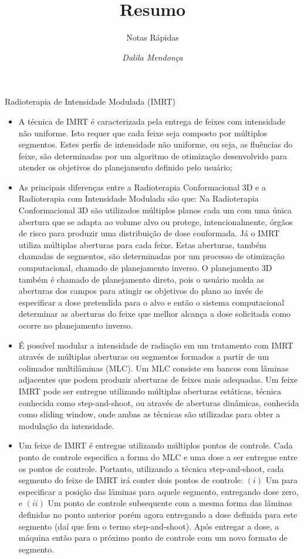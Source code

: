 \documentclass[11pt,a4paper]{article}
\title{Resumo}
\author{Notas Rápidas \nocite{*}}
\date{\textit{Dalila Mendonça}}
\newcounter{exemplo}
\begin{document}
	\maketitle


\begin{exemplo}
    \textcolor{CarnationPink}{Radioterapia de Intensidade Modulada (IMRT)}
    \begin{itemize}
        \item A técnica de IMRT é caracterizada pela entrega de feixes com intensidade não uniforme. Isto requer que cada feixe seja composto por múltiplos segmentos. Estes perfis de intensidade não uniforme, ou seja, as fluências do feixe,  são determinadas por um algoritmo de otimização desenvolvido para atender os objetivos do planejamento definido pelo usuário;
        
        \item As principais diferenças entre a Radioterapia Conformacional 3D e a Radioterapia com Intensidade Modulada são que: Na Radioterapia Conformacional 3D são utilizados múltiplos planos cada um com uma única abertura que se adapta ao volume alvo ou protege, intencionalmente, órgãos de risco para produzir uma distribuição de dose conformada. Já o IMRT utiliza múltiplas aberturas para cada feixe. Estas aberturas, também chamadas de segmentos, são determinadas por um processo de otimização computacional, chamado de \textcolor{CarnationPink}{planejamento inverso}. O planejamento 3D também é chamado de \textcolor{CarnationPink}{planejamento direto}, pois o usuário molda as aberturas dos campos para atingir os objetivos do plano ao invés de especificar a dose pretendida para o alvo e então o sistema computacional determinar as aberturas do feixe que melhor alcança a dose solicitada como ocorre no planejamento inverso.
        
        \item É possível modular a intensidade de radiação em um tratamento com IMRT através de múltiplas aberturas ou segmentos formados a partir de um colimador multilâminas (MLC). Um MLC consiste em bancos com lâminas adjacentes que podem produzir aberturas de feixes mais adequadas. Um feixe IMRT pode ser entregue utilizando múltiplas aberturas estáticas, técnica conhecida como step-and-shoot, ou através de aberturas dinâmicas, conhecida como sliding window, onde ambas as técnicas são utilizadas para obter a modulação da intensidade. 
        
        \item Um feixe de IMRT é entregue utilizando múltiplos pontos de controle. Cada ponto de controle especifica a forma do MLC e uma dose a ser entregue entre os pontos de controle. Portanto, utilizando a técnica \textcolor{CarnationPink}{step-and-shoot}, cada segmento do feixe de IMRT irá conter dois pontos de controle: $(i)$ Um para especificar a posição das lâminas para aquele segmento, entregando dose zero, e $(ii)$ Um ponto de controle subsequente com a mesma forma das lâminas definidas no ponto anterior  porém agora entregando a dose definida para este segmento (daí que fem o termo step-and-shoot). Após entregar a dose, a máquina então para o próximo ponto de controle com um novo formato de segmento.
        

\end{itemize}
\end{exemplo}
\end{document}
